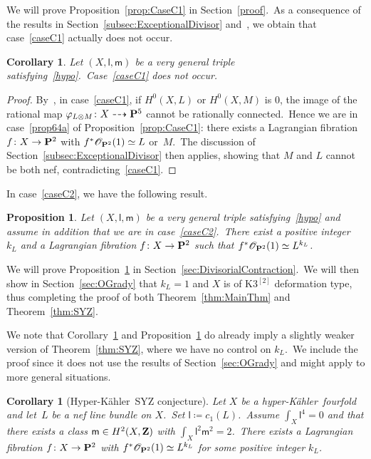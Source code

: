 \documentclass[12pt]{amsart}
\def\cO{\mathscr{O}}
\def\Z{{\bf Z}}
\def\P{{\bf P}}
\def\phi{\varphi}
\def\otp{}
\def\isom{\simeq}
\def\dra{\dashrightarrow}
\def\HK{Hyper-K\"ahler}
\def\hk{hyper-K\"ahler}
\newtheorem{coro}[lemm]{Corollary}
\newtheorem{prop}[lemm]{Proposition}
\theoremstyle{remark}
\def\lll{\ensuremath{\mathsf l}}
\def\mm{\ensuremath{\mathsf m}}
\begin{document}
We will prove Proposition~\ref{prop:CaseC1} in Section~\ref{proof}.\
As a consequence of the results in Section~\ref{subsec:ExceptionalDivisor} and~\cite{voisinfib}, we obtain that case~\ref{caseC1} actually does not occur.

\begin{coro}\label{cor:NoTwoIsotropicNef}
Let $(X,\lll,\mm)$ be a very general triple satisfying~\eqref{hypo}.\
Case~{\rm\ref{caseC1}} does not occur.
\end{coro}

\begin{proof}
By~\cite[Theorem 4.2]{voisinfib}, in case~\ref{caseC1}, if $H^0(X,L)$ or $H^0(X,M)$ is $0$, the image of the rational map $\phi_{L\otimes M}\colon X\dra \P^5$ cannot be rationally connected.\ 
Hence we are in case~\ref{prop64a} of  Proposition~\ref{prop:CaseC1}: there exists a Lagrangian fibration \mbox{$f\colon X\to\P^2$} with $f^*{\cO_{\P^2}}(1)\isom L$ or~$M$.\
The discussion of Section~\ref{subsec:ExceptionalDivisor} then applies, showing that $M$ and $L$ cannot be both nef,    contradicting~\ref{caseC1}.
\end{proof}

In case~\ref{caseC2}, we have the following result.

\begin{prop}\label{prop:CaseC2}
Let $(X,\lll,\mm)$ be a very general triple
satisfying~\eqref{hypo} and assume in addition that we are in case~{\rm\ref{caseC2}}.\
 There exist a positive integer~$k_L$ and a Lagrangian fibration \mbox{$f\colon X\to\P^2$} such that $f^*{\cO_{\P^2}}(1)\isom L^{\otp {k_L}}$.
\end{prop}

We will prove Proposition~\ref{prop:CaseC2} in Section~\ref{sec:DivisorialContraction}.\
We will then show in Section~\ref{sec:OGrady} that   $k_L=1$ and $X$ is of  K3$^{[2]}$ deformation type, thus completing the proof of both Theorem~\ref{thm:MainThm} and Theorem~\ref{thm:SYZ}.

We note that Corollary~\ref{cor:NoTwoIsotropicNef} and Proposition~\ref{prop:CaseC2} do already imply a slightly weaker version of Theorem~\ref{thm:SYZ}, where we have no control on $k_L$.\
We include the proof since it does not use the results of Section~\ref{sec:OGrady} and  might apply to more general situations.



\begin{coro}[\HK\ SYZ conjecture]\label{cor:SYZ}
Let $X$ be a  \hk\ fourfold and let~$L$ be a nef line bundle on $X$.\ Set $\lll\coloneqq c_1(L)$.\ Assume   $\int_X \lll^4=0$ and that there exists a class $\mm\in H^2(X,{\Z})$ with $\int_X\lll^2\mm^2=2$.\
There exists a Lagrangian fibration $f\colon X\to\P^2$ with $f^*{\cO_{\P^2}}(1)\isom L^{\otp k_L}$ for some positive integer $k_L$.
\end{coro}
\end{document}
